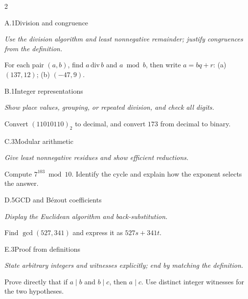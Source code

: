 \documentclass[9pt]{extarticle}
\begin{document}
\begin{multicols}{2}
\begin{CoreProblem}{A.1}{Division and congruence}
{\scriptsize\textit{Use the division algorithm and least nonnegative remainder; justify congruences from the definition.}\par}
For each pair $(a,b)$, find $a\,\mathrm{div}\,b$ and $a\bmod b$, then write
$a=bq+r$: (a) $(137,12)$; (b) $(-47,9)$.
\end{CoreProblem}
\begin{CoreProblem}{B.1}{Integer representations}
{\scriptsize\textit{Show place values, grouping, or repeated division, and check all digits.}\par}
Convert $(11010110)_2$ to decimal, and convert $173$ from decimal to binary.
\end{CoreProblem}
\begin{CoreProblem}{C.3}{Modular arithmetic}
{\scriptsize\textit{Give least nonnegative residues and show efficient reductions.}\par}
Compute $7^{103}\bmod10$. Identify the cycle and explain how the exponent
selects the answer.
\end{CoreProblem}
\columnbreak
\begin{CoreProblem}{D.5}{GCD and B\'ezout coefficients}
{\scriptsize\textit{Display the Euclidean algorithm and back-substitution.}\par}
Find $\gcd(527,341)$ and express it as $527s+341t$.
\end{CoreProblem}
\begin{CoreProblem}{E.3}{Proof from definitions}
{\scriptsize\textit{State arbitrary integers and witnesses explicitly; end by matching the definition.}\par}
Prove directly that if $a\mid b$ and $b\mid c$, then $a\mid c$. Use distinct
integer witnesses for the two hypotheses.
\end{CoreProblem}
\end{multicols}
\CoreWorkArea
\FormBreak
{}
\end{document}
